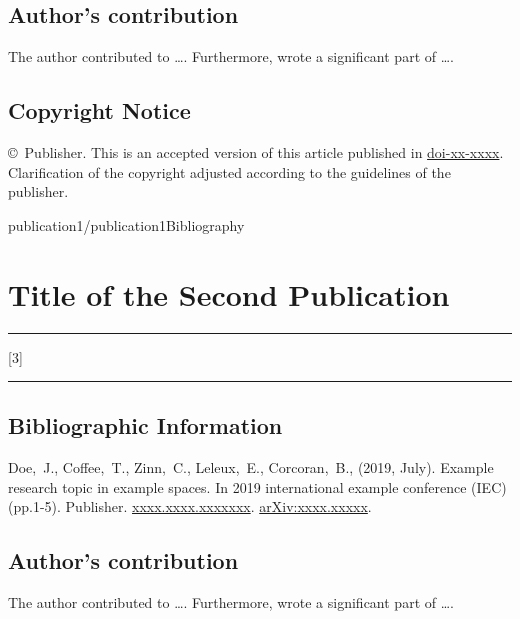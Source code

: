 \documentclass[12pt, a4paper, unicode]{report}
\newcommand{\smalltoc}[4]{
    \vspace{1pc}
    \ifthenelse{\equal{#4}{}}{}{\section*{#4}}
    \hrule\vspace{1pc}
    \startcontents[#1]
    \printcontents[#1]{}{#2}[#3]{}
    \vspace{1pc}
    \hrule
    \vspace{1pc}
}
\begin{document}
    \section*{Author's contribution}
    The author contributed to \dots. Furthermore, wrote a significant part of \dots.
    
    \section*{Copyright Notice}
    \copyright \the\year\ Publisher. This is an accepted version of this article published in \href{https://doi.org}{doi-xx-xxxx}. Clarification of the copyright adjusted according to the guidelines of the publisher.
    \clearpage
    
    
    
    {publication1/publication1}{Bibliography}
    
    \stopcontents[p2ch1]
    
    \chapter{Title of the Second Publication}
    
    \smalltoc{p2ch2}{0}{3}{Outline}
    
    \section*{Bibliographic Information}
    Doe,~J., Coffee,~T., Zinn,~C., Leleux,~E., Corcoran,~B., (2019, July). Example research topic in example spaces. In 2019 international example conference (IEC) (pp.1-5). Publisher. \href{https://doi.org}{xxxx.xxxx.xxxxxxx}. \href{https://arxiv.org}{arXiv:xxxx.xxxxx}.
    
    \section*{Author's contribution}
    The author contributed to \dots. Furthermore, wrote a significant part of \dots.
    
\end{document}
